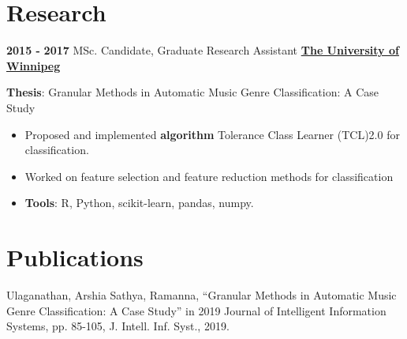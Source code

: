 \documentclass[letterpaper]{twentysecondcv} %
\begin{document}
\section{Research}
\vspace{-0.1cm}
\begin{twenty}
	\twentyitem
    	{\bf 2015 -}
    	{\bf 2017}
        {\large MSc. Candidate, Graduate Research Assistant}
        {\href{https://www.uwinnipeg.ca/}{\bf \large The University of Winnipeg}}
        {}
        {
       	\textbf{Thesis}: Granular Methods in Automatic Music Genre Classification: A Case Study
        {\begin{itemize}
        \item Proposed and implemented \textbf{algorithm }Tolerance Class Learner (TCL)2.0 for classification.
        \item Worked on feature selection and feature reduction methods for classification
        \item \textbf{Tools}: R, Python, scikit-learn, pandas, numpy. \vspace{2mm}
		\end{itemize}}
        }
\end{twenty}
\vspace{-0.6cm}
\section{Publications}
\vspace{-0.2cm}
Ulaganathan, Arshia Sathya, Ramanna, “Granular Methods in Automatic Music Genre Classification: A Case Study” in 2019  Journal of Intelligent Information Systems, pp. 85-105, J. Intell. Inf. Syst., 2019. \vspace{2mm}
\vspace{-0.6cm}
\end{document}
